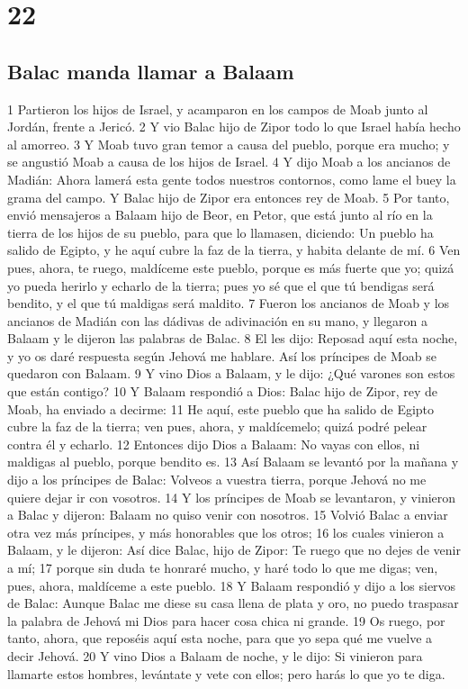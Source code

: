 \chapter{22}

\section*{Balac manda llamar a Balaam}

1 Partieron los hijos de Israel, y acamparon en los campos de Moab junto al Jordán, frente a Jericó. 
2 Y vio Balac hijo de Zipor todo lo que Israel había hecho al amorreo.
3 Y Moab tuvo gran temor a causa del pueblo, porque era mucho; y se angustió Moab a causa de los hijos de Israel.
4 Y dijo Moab a los ancianos de Madián: Ahora lamerá esta gente todos nuestros contornos, como lame el buey la grama del campo. Y Balac hijo de Zipor era entonces rey de Moab. 
5 Por tanto, envió mensajeros a Balaam hijo de Beor, en Petor, que está junto al río en la tierra de los hijos de su pueblo, para que lo llamasen, diciendo: Un pueblo ha salido de Egipto, y he aquí cubre la faz de la tierra, y habita delante de mí.
6 Ven pues, ahora, te ruego, maldíceme este pueblo, porque es más fuerte que yo; quizá yo pueda herirlo y echarlo de la tierra; pues yo sé que el que tú bendigas será bendito, y el que tú maldigas será maldito.
7 Fueron los ancianos de Moab y los ancianos de Madián con las dádivas de adivinación en su mano, y llegaron a Balaam y le dijeron las palabras de Balac.
8 El les dijo: Reposad aquí esta noche, y yo os daré respuesta según Jehová me hablare. Así los príncipes de Moab se quedaron con Balaam.
9 Y vino Dios a Balaam, y le dijo: ¿Qué varones son estos que están contigo?
10 Y Balaam respondió a Dios: Balac hijo de Zipor, rey de Moab, ha enviado a decirme:
11 He aquí, este pueblo que ha salido de Egipto cubre la faz de la tierra; ven pues, ahora, y maldícemelo; quizá podré pelear contra él y echarlo.
12 Entonces dijo Dios a Balaam: No vayas con ellos, ni maldigas al pueblo, porque bendito es.
13 Así Balaam se levantó por la mañana y dijo a los príncipes de Balac: Volveos a vuestra tierra, porque Jehová no me quiere dejar ir con vosotros.
14 Y los príncipes de Moab se levantaron, y vinieron a Balac y dijeron: Balaam no quiso venir con nosotros.
15 Volvió Balac a enviar otra vez más príncipes, y más honorables que los otros;
16 los cuales vinieron a Balaam, y le dijeron: Así dice Balac, hijo de Zipor: Te ruego que no dejes de venir a mí;
17 porque sin duda te honraré mucho, y haré todo lo que me digas; ven, pues, ahora, maldíceme a este pueblo. 
18 Y Balaam respondió y dijo a los siervos de Balac: Aunque Balac me diese su casa llena de plata y oro, no puedo traspasar la palabra de Jehová mi Dios para hacer cosa chica ni grande.
19 Os ruego, por tanto, ahora, que reposéis aquí esta noche, para que yo sepa qué me vuelve a decir Jehová.
20 Y vino Dios a Balaam de noche, y le dijo: Si vinieron para llamarte estos hombres, levántate y vete con ellos; pero harás lo que yo te diga.

